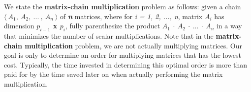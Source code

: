 We state the {\bfseries matrix-chain multiplication} problem as follows: given a chain $\langle\ A_{1},\ A_{2},\ ...\ ,\ A_{n}\ \rangle$ of {\itshape\bfseries n} matrices, where for {\itshape i = 1, 2, ..., n}, matrix {\itshape $A_{i}$} has dimension {\bfseries $p_{i-1}$ x $p_{i}$}, fully parenthesize the product $A_{1}\ \cdot\ A_{2}\ \cdot\ ...\ \cdot\ A_{n}$ in a way that minimizes the number of scalar multiplications. Note that in the {\bfseries matrix-chain multiplication} problem, we are not actually multiplying matrices. Our goal is only to determine an order for multiplying matrices that has the lowest cost. Typically, the time invested in determining this optimal order is more than paid for by the time saved later on when actually performing the matrix multiplication.

\pagebreak